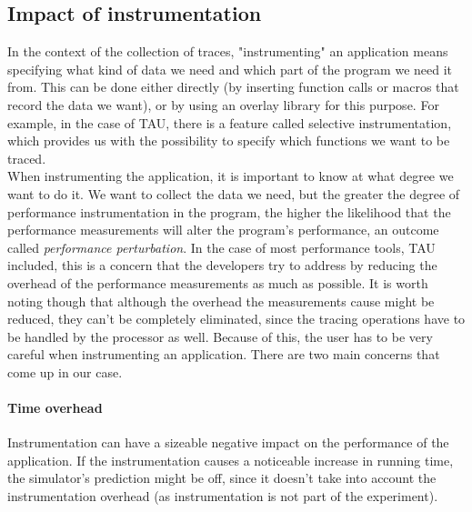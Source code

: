 \subsection{Impact of instrumentation}
In the context of the collection of traces, "instrumenting" an
application means specifying what kind of data we need and which
part of the program we need it from. This can be done either directly
(by inserting function calls or macros that record the data we want),
or by using an overlay library for this purpose. For example, in the
case of TAU, there is a feature called selective instrumentation,
which provides us with the possibility to specify which functions we
want to be traced.\\[0.3cm]
When instrumenting the application, it is important to know at what
degree we want to do it. We want to collect the data we need, but the
greater the degree of performance instrumentation in the program, the
higher the likelihood that the performance measurements will alter the
program's performance, an outcome called \emph{performance
 perturbation}.\cite{sm06} In the case of most performance tools, TAU
included, this is a concern that the developers try to address by
reducing the overhead of the performance measurements as much as
possible. It is worth noting though that although the overhead the
measurements cause might be reduced, they can't be completely
eliminated, since the tracing operations have to
be handled by the processor as well. Because of this, the user has to be
very careful when instrumenting an application. There are two main
concerns that come up in our case.
\paragraph{Time overhead}
Instrumentation can have a sizeable negative impact on the performance
of the application. If the instrumentation causes a noticeable
increase in running time, the simulator's prediction might be off,
since it doesn't take into account the instrumentation overhead (as
instrumentation is not part of the experiment).

